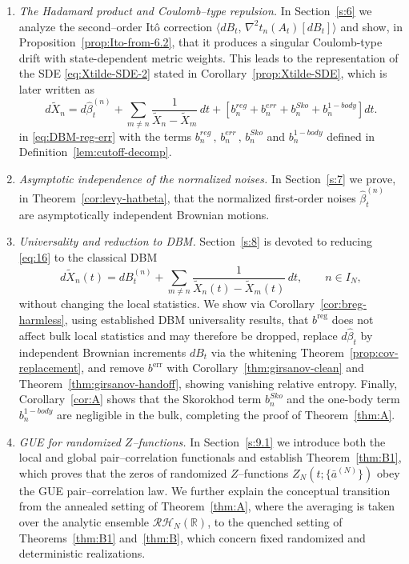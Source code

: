 \documentclass[12pt,reqno]{amsart}
\theoremstyle{plain}
\theoremstyle{definition}
\theoremstyle{remark}
\begin{document}
\begin{enumerate}
  \item \emph{The Hadamard product and Coulomb–type repulsion.} In Section~\ref{s:6} we analyze the second–order Itô correction $\langle dB_t,\,\nabla^2 t_n(A_t)[dB_t]\rangle$ and show, in Proposition~\ref{prop:Ito-from-6.2}, that it produces a singular Coulomb-type drift with state-dependent metric weights. 
This leads to the representation of the SDE \eqref{eq:Xtilde-SDE-2}  stated in Corollary~\ref{prop:Xtilde-SDE}, which is later written as
  \begin{equation}\label{eq:16}
d\widetilde X_n
= d\hat\beta^{(n)}_t
+ \sum_{m \neq n}\frac{1}{\widetilde X_n-\widetilde X_m}\,dt+ \left [ b^{reg}_n+b^{err}_n+ b_n^{Sko}+b^{1-body}_n \right ] dt.
\end{equation}
in \eqref{eq:DBM-reg-err} with the terms $ b^{reg}_n\, ,\, b^{err}_n \, ,\, b_n^{Sko}$ and $b^{1-body}_n$ defined in  Definition~\ref{lem:cutoff-decomp}.

  \item \emph{Asymptotic independence of the normalized noises.} In Section~\ref{s:7} we prove, in Theorem~\ref{cor:levy-hatbeta}, that the normalized first-order noises $\hat{\beta}^{(n)}_t$ are asymptotically independent Brownian motions.

  \item \emph{Universality and reduction to DBM.}
  Section~\ref{s:8} is devoted to reducing \eqref{eq:16} to the classical DBM
  \begin{equation}
  d\widetilde X_n(t)
  = dB^{(n)}_t + \sum_{m\neq n}\frac{1}{\widetilde X_n(t)-\widetilde X_m(t)}\,dt,
  \qquad n\in I_N,
  \end{equation}
  without changing the local statistics. We show via Corollary~\ref{cor:breg-harmless}, using established DBM universality results, that $b^{\mathrm{reg}}$ does not affect bulk local statistics and may therefore be dropped, replace $d\hat\beta_t$ by independent Brownian increments $dB_t$ via the whitening Theorem~\ref{prop:cov-replacement}, and remove $b^{\mathrm{err}}$ with Corollary~\ref{thm:girsanov-clean} and Theorem~\ref{thm:girsanov-handoff}, showing vanishing relative entropy. Finally, Corollary~\ref{cor:A} shows that the Skorokhod term $b_n^{Sko}$ and the one-body term $b^{1-body}_n$ are negligible in the bulk, completing the proof of Theorem~\ref{thm:A}.

\item \emph{GUE for randomized $Z$--functions.}  
In Section~\ref{s:9.1} we introduce both the local and global pair--correlation functionals and establish Theorem~\ref{thm:B1}, which proves that the zeros of randomized $Z$--functions 
$Z_N(t;\{\bar a^{(N)}\})$ obey the GUE pair--correlation law.  
We further explain the conceptual transition from the annealed setting of Theorem~\ref{thm:A}, where the averaging is taken over the analytic ensemble 
$\mathcal{RH}_N(\mathbb{R})$, to the quenched setting of Theorems~\ref{thm:B1} and~\ref{thm:B}, which concern fixed randomized and deterministic realizations.  
 

\end{enumerate}
\end{document}
